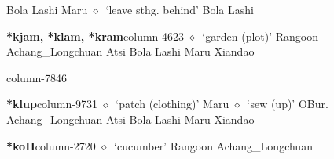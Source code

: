          Bola 
\hspace{1ex}
         Lashi 
\hspace{1ex}
         Maru 
\hspace{1ex}
         $\diamond$~`leave sthg. behind'
         Bola 
\hspace{1ex}
         Lashi 
  \item {\footnotesize \textbf{*kjam, *klam, *kram}}{\tiny column-4623}
         $\diamond$~`garden (plot)'
         Rangoon 
\hspace{1ex}
         Achang\_Longchuan 
\hspace{1ex}
         Atsi 
\hspace{1ex}
         Bola 
\hspace{1ex}
         Lashi 
\hspace{1ex}
         Maru 
\hspace{1ex}
         Xiandao 
  \item {\footnotesize \textbf{}}{\tiny column-7846}
  \item {\footnotesize \textbf{*klup}}{\tiny column-9731}
         $\diamond$~`patch (clothing)'
         Maru 
\hspace{1ex}
         $\diamond$~`sew (up)'
         OBur. 
\hspace{1ex}
         Achang\_Longchuan 
\hspace{1ex}
         Atsi 
\hspace{1ex}
         Bola 
\hspace{1ex}
         Lashi 
\hspace{1ex}
         Maru 
\hspace{1ex}
         Xiandao 
  \item {\footnotesize \textbf{*koH}}{\tiny column-2720}
         $\diamond$~`cucumber'
         Rangoon 
\hspace{1ex}
         Achang\_Longchuan 
